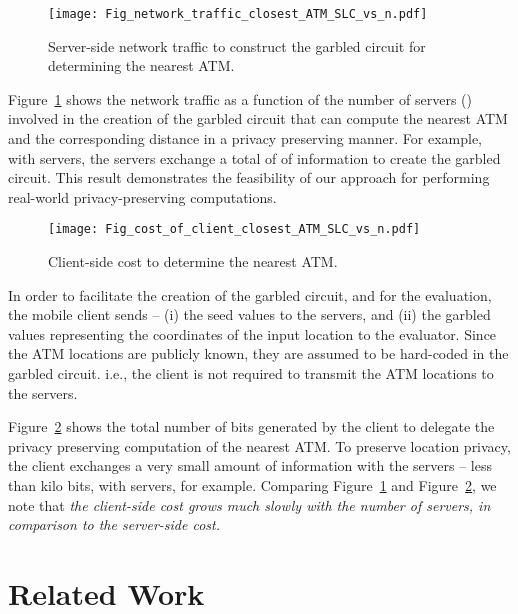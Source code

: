 \documentclass[10pt,journal,cspaper,compsoc]{IEEEtran}
\begin{document}
\begin{figure}[t]
\centering
\texttt{[image: Fig\_network\_traffic\_closest\_ATM\_SLC\_vs\_n.pdf]}
\caption{Server-side network traffic to construct the garbled circuit for determining the nearest ATM.}\label{fig_server_side_network_traffic_closest_ATM}
\end{figure}


Figure~\ref{fig_server_side_network_traffic_closest_ATM} shows the network traffic as a function of the number of servers () involved in the creation of the garbled circuit that can compute the nearest ATM and the corresponding distance in a privacy preserving manner. For example, with  servers, the servers exchange a total of   of information to create the garbled circuit. This result demonstrates the feasibility of our approach for performing real-world privacy-preserving computations.


\begin{figure}[t]
\centering
\texttt{[image: Fig\_cost\_of\_client\_closest\_ATM\_SLC\_vs\_n.pdf]}
\caption{Client-side cost to determine the nearest ATM.}\label{fig_client_side_cost_closest_ATM}
\end{figure}


In order to facilitate the creation of the garbled circuit, and for the evaluation, the mobile client sends -- (i) the seed values to the  servers, and (ii) the garbled values representing the coordinates of the input location to the evaluator. Since the ATM locations are publicly known, they are assumed to be hard-coded in the garbled circuit. i.e., the client is not required to transmit the ATM locations to the servers.


Figure~\ref{fig_client_side_cost_closest_ATM} shows the total number of bits generated by the client to delegate the privacy preserving computation of the nearest ATM. To preserve location privacy, the client exchanges a very small amount of information with the servers -- less than  kilo bits, with  servers, for example. Comparing Figure~\ref{fig_server_side_network_traffic_closest_ATM} and Figure~\ref{fig_client_side_cost_closest_ATM}, we note that {\em the client-side cost grows much slowly with the number of servers, in comparison to the server-side cost.}

 \section{Related Work}
\label{sec_related_work}
\end{document}
